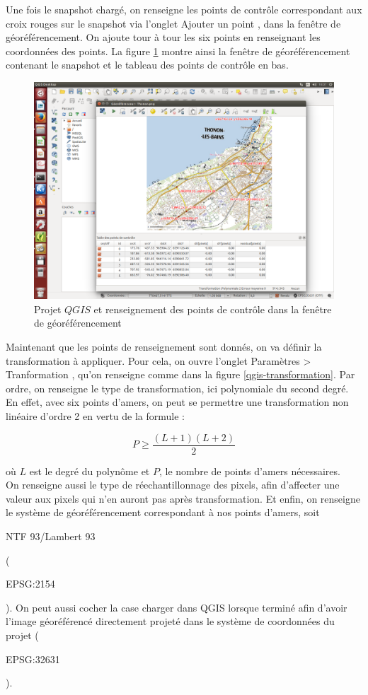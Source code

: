\documentclass{book}
\begin{document}
Une fois le snapshot chargé, on renseigne les points de contr\^{o}le correspondant aux croix rouges sur le snapshot via l'onglet 
\og Ajouter un point \fg{}, dans la fenêtre de géoréférencement. On ajoute tour à tour les six points en renseignant
les coordonnées des points. La figure \ref{qgis-points} montre ainsi la fen\^{e}tre de géoréférencement contenant le snapshot 
et le tableau des points de contr\^{o}le en bas.

\begin{figure}[H]
\begin{center}
\includegraphics[scale=0.3]{images/georeferencing/qgis-points.png}
\end{center}
\caption{Projet $QGIS$ et renseignement des points de contr\^{o}le dans la fen\^{e}tre de géoréférencement}
\label{qgis-points}
\end{figure}

Maintenant que les points de renseignement sont donnés, on va définir la transformation à appliquer. Pour cela, on ouvre l'onglet
 \og Paramètres > Tranformation \fg{}, qu'on renseigne comme dans la figure \ref{qgis-transformation}. Par ordre, 
on renseigne le type de transformation, ici polynomiale du second degré. En effet, avec six points d'amers, on peut se permettre
une transformation non linéaire d'ordre 2 en vertu de la formule \cite{Nicolas:2014}:

\[P\ge\frac{(L+1)(L+2)}{2}\]

où $L$ est le degré du polyn\^{o}me et $P$, le nombre de points d'amers nécessaires.\\
On renseigne aussi le type de réechantillonnage des pixels, afin d'affecter une valeur aux pixels qui n'en auront pas
après transformation. Et enfin, on renseigne le système de géoréférencement correspondant 
à nos points d'amers, soit \begin{itshape}NTF 93/Lambert 93\end{itshape} (\begin{itshape}EPSG:2154\end{itshape}). On peut aussi
 cocher la case \og charger dans QGIS lorsque terminé \fg{} afin d'avoir l'image géoréférencé directement
 projeté dans le système de coordonnées du projet (\begin{itshape}EPSG:32631\end{itshape}).
\end{document}
